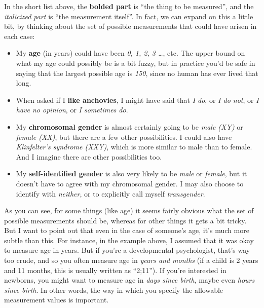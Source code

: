 \documentclass[
]{book}
\begin{document}
In the short list above, the {\textbf{bolded part}} is ``the thing to be measured'', and the {\emph{italicized part}} is ``the measurement itself''. In fact, we can expand on this a little bit, by thinking about the set of possible measurements that could have arisen in each case:

\begin{itemize}
\item
  My {\textbf{age}} (in years) could have been {\emph{0, 1, 2, 3 \ldots{}}}, etc. The upper bound on what my age could possibly be is a bit fuzzy, but in practice you'd be safe in saying that the largest possible age is {\emph{150}}, since no human has ever lived that long.
\item
  When asked if I {\textbf{like anchovies}}, I might have said that {\emph{I do}}, or {\emph{I do not}}, or {\emph{I have no opinion}}, or {\emph{I sometimes do}}.
\item
  My {\textbf{chromosomal gender}} is almost certainly going to be {\emph{male (XY)}} or {\emph{female (XX)}}, but there are a few other possibilities. I could also have {\emph{Klinfelter's syndrome (XXY)}}, which is more similar to male than to female. And I imagine there are other possibilities too.
\item
  My {\textbf{self-identified gender}} is also very likely to be {\emph{male}} or {\emph{female}}, but it doesn't have to agree with my chromosomal gender. I may also choose to identify with {\emph{neither}}, or to explicitly call myself {\emph{transgender}}.
\end{itemize}

As you can see, for some things (like age) it seems fairly obvious what the set of possible measurements should be, whereas for other things it gets a bit tricky. But I want to point out that even in the case of someone's age, it's much more subtle than this. For instance, in the example above, I assumed that it was okay to measure age in years. But if you're a developmental psychologist, that's way too crude, and so you often measure age in {\emph{years and months}} (if a child is 2 years and 11 months, this is usually written as ``2;11''). If you're interested in newborns, you might want to measure age in {\emph{days since birth}}, maybe even {\emph{hours since birth}}. In other words, the way in which you specify the allowable measurement values is important.
\end{document}
